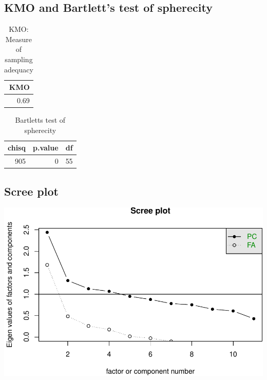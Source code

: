 \documentclass[]{article}
\begin{document}
\hypertarget{kmo-and-bartletts-test-of-spherecity-11}{%
\subsection{KMO and Bartlett's test of
spherecity}\label{kmo-and-bartletts-test-of-spherecity-11}}

\begin{table}[H]

\caption{\label{tab:unnamed-chunk-59}KMO: Measure of sampling adequacy}
\centering
\fontsize{6}{8}\selectfont
\begin{tabular}[t]{r}
\toprule
KMO\\
\midrule
0.69\\
\bottomrule
\end{tabular}
\end{table}

\begin{table}[H]

\caption{\label{tab:unnamed-chunk-59}Bartletts test of spherecity}
\centering
\fontsize{6}{8}\selectfont
\begin{tabular}[t]{rrr}
\toprule
chisq & p.value & df\\
\midrule
905 & 0 & 55\\
\bottomrule
\end{tabular}
\end{table}

\hypertarget{scree-plot-11}{%
\subsection{Scree plot}\label{scree-plot-11}}

\includegraphics{PCA_covid_files/figure-latex/unnamed-chunk-60-1.pdf}
\end{document}
